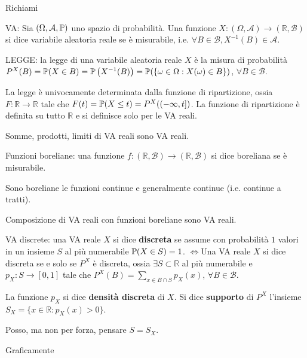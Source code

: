 
\ParteEsercizi

Richiami

VA: Sia $( \Omega ,\mathcal{A} ,\mathbb{P})$ uno spazio di probabilità. Una funzione $X:( \Omega ,\mathcal{A})\rightarrow (\mathbb{R} ,\mathcal{B})$ si dice variabile aleatoria reale se è misurabile, i.e. $\forall B\in \mathcal{B} ,X^{-1}( B) \in \mathcal{A}$.

LEGGE: la legge di una variabile aleatoria reale $X$ è la misura di probabilità $P^{X}( B) =\mathbb{P}( X\in B) =\mathbb{P}\left( X^{-1}( B)\right) =\mathbb{P}(\{\omega \in \Omega :X( \omega ) \in B\})$, $\forall B\in \mathcal{B}$.
\begin{oss}
La legge è univocamente determinata dalla funzione di ripartizione, ossia $F:\mathbb{R}\rightarrow \mathbb{R}$ tale che $F( t) =\mathbb{P}( X\leq t) =P^{X}(( -\infty ,t])$. La funzione di ripartizione è definita su tutto $\mathbb{R}$ e si definisce solo per le VA reali.
\end{oss}
\begin{oss}
Somme, prodotti, limiti di VA reali sono VA reali.
\end{oss}
Funzioni boreliane: una funzione $f:(\mathbb{R} ,\mathcal{B})\rightarrow (\mathbb{R} ,\mathcal{B})$ si dice boreliana se è misurabile.
\begin{oss}
Sono boreliane le funzioni continue e generalmente continue (i.e. continue a tratti).
\end{oss}
\begin{oss}
Composizione di VA reali con funzioni boreliane sono VA reali.
\end{oss}
VA discrete: una VA reale $X$ si dice \textbf{discreta} se assume con probabilità $1$ valori in un insieme $S$ al più numerabile $\mathbb{P}( X\in S) =1$. $\iff $Una VA reale $X$ si dice discreta se e solo se $P^{X}$ è discreta, ossia $\exists S\subset \mathbb{R}$ al più numerabile e $p_{X} :S\rightarrow [ 0,1]$ tale che $P^{X}( B) =\sum\limits _{x\in B\cap S} p_{X}( x)$, $\forall B\in \mathcal{B}$.

La funzione $p_{X}$ si dice \textbf{densità discreta} di $X$. Si dice \textbf{supporto} di $P^{X}$ l'insieme $S_{X} =\{x\in \mathbb{R} :p_{X}( x)  >0\}$.
\begin{oss}
Posso, ma non per forza, pensare $S=S_{X}$.
\end{oss}
Graficamente



